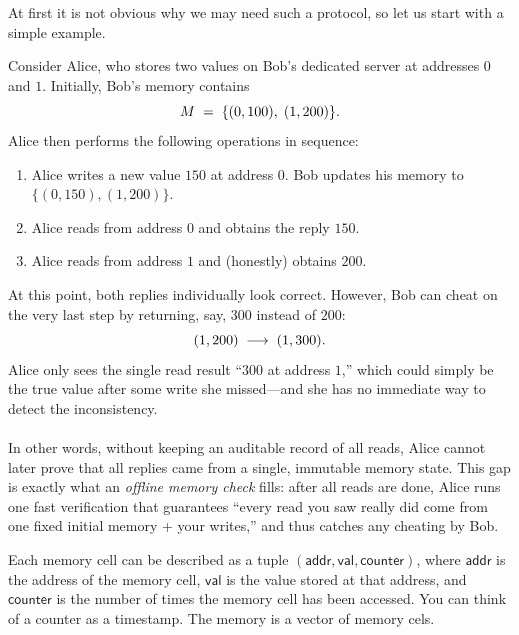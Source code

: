 \documentclass[../../book]{subfiles}
\begin{document}
At first it is not obvious why we may need such a protocol, so let us start with a simple 
example.
\begin{example}
    Consider Alice, who stores two values on Bob's dedicated server at addresses $0$ and $1$.  Initially, 
    Bob's memory contains
    \vspace{-5px}
    \begin{equation*}
      M \;=\;\{(0,100),\;(1,200)\}.
      \vspace{-5px}
    \end{equation*}
    Alice then performs the following operations in sequence:
    \begin{enumerate}
        \item Alice writes a new value $150$ at address $0$.  Bob updates his memory to $\{(0,150),(1,200)\}$.
        \item Alice reads from address $0$ and obtains the reply $150$.
        \item Alice reads from address $1$ and (honestly) obtains $200$.
    \end{enumerate}
    At this point, both replies individually look correct. However, Bob can cheat on the very last step by 
    returning, say, $300$ instead of $200$:
    \vspace{-5px}
    \begin{equation*}
      (1,200)\;\longrightarrow\;(1,300).
      \vspace{-5px}
    \end{equation*}
    Alice only sees the single read result ``$300$ at address $1$,'' which could simply be the true value 
    after some write she missed—and she has no immediate way to detect the inconsistency.\\ \\
    In other words, without keeping an auditable record of all reads, Alice cannot later prove that all 
    replies came from a single, immutable memory state.  This gap is exactly what an \emph{offline memory check}
    fills: after all reads are done, Alice runs one fast verification that guarantees “every read you saw really
    did come from one fixed initial memory + your writes,” and thus catches any cheating by Bob.
\end{example}

Each memory cell can be described as a tuple $\mathsf{(addr, val, counter)}$, where $\mathsf{addr}$ is the
address of the memory cell, $\mathsf{val}$ is the value stored at that address, and $\mathsf{counter}$ is the
number of times the memory cell has been accessed. You can think of a counter as a timestamp. The memory is
a vector of memory cels.
\end{document}
